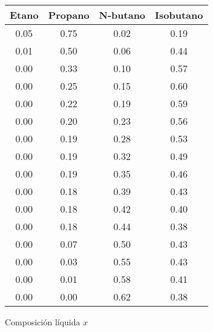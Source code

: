 \begin{figure}[H]
    \centering
    \caption{Composición líquida $x$}
    \small
    \begin{tabular}{|c|c|c|c|}
        \hline
        \textbf{Etano} & \textbf{Propano} & \textbf{N-butano} & \textbf{Isobutano} \\
        \hline
        0.05           & 0.75             & 0.02              & 0.19               \\
        \hline
        0.01           & 0.50             & 0.06              & 0.44               \\
        \hline
        0.00           & 0.33             & 0.10              & 0.57               \\
        \hline
        0.00           & 0.25             & 0.15              & 0.60               \\
        \hline
        0.00           & 0.22             & 0.19              & 0.59               \\
        \hline
        0.00           & 0.20             & 0.23              & 0.56               \\
        \hline
        0.00           & 0.19             & 0.28              & 0.53               \\
        \hline
        0.00           & 0.19             & 0.32              & 0.49               \\
        \hline
        0.00           & 0.19             & 0.35              & 0.46               \\
        \hline
        0.00           & 0.18             & 0.39              & 0.43               \\
        \hline
        0.00           & 0.18             & 0.42              & 0.40               \\
        \hline
        0.00           & 0.18             & 0.44              & 0.38               \\
        \hline
        0.00           & 0.07             & 0.50              & 0.43               \\
        \hline
        0.00           & 0.03             & 0.55              & 0.43               \\
        \hline
        0.00           & 0.01             & 0.58              & 0.41               \\
        \hline
        0.00           & 0.00             & 0.62              & 0.38               \\
        \hline

\end{tabular}
\end{figure}
